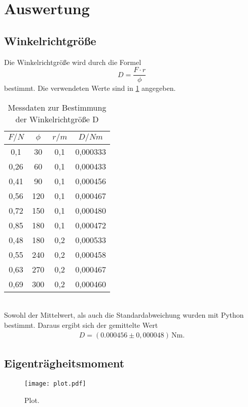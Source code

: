 \section{Auswertung}
\label{sec:Auswertung}
\subsection{Winkelrichtgröße}
Die Winkelrichtgröße wird durch die Formel
\begin{equation}
  D = \frac{F \cdot r}{\phi}
\end{equation}
bestimmt. Die verwendeten Werte sind in \ref{tab:winkelrichtgr} angegeben.
\begin{table}
  \centering
  \caption{Messdaten zur Bestimmung der Winkelrichtgröße D}
  \label{tab:winkelrichtgr}
  \begin{tabular}{c c c c}
    \toprule
    $F/N$ & $\phi$ & $r/m$ & $D/Nm$ \\
    \midrule
    0,1  &  30 & 0,1 & 0,000333\\
    0,26 &  60 & 0,1 & 0,000433\\
    0,41 &  90 & 0,1 & 0,000456\\
    0,56 & 120 & 0,1 & 0,000467\\
    0,72 & 150 & 0,1 & 0,000480\\
    0,85 & 180 & 0,1 & 0,000472\\
    0,48 & 180 & 0,2 & 0,000533\\
    0,55 & 240 & 0,2 & 0,000458\\
    0,63 & 270 & 0,2 & 0,000467\\
    0,69 & 300 & 0,2 & 0,000460\\
    \bottomrule
  \end{tabular}
\end{table}
\\Sowohl der Mittelwert, als auch die Standardabweichung wurden mit Python bestimmt. Daraus ergibt sich der
gemittelte Wert
\begin{align*}
    D = (0.000456 \pm 0{,}000048)\,\mathrm{Nm} .
\end{align*}

\subsection{Eigenträgheitsmoment}
\begin{figure}
  \centering
  \texttt{[image: plot.pdf]}
  \caption{Plot.}
  \label{fig:plot}
\end{figure}

